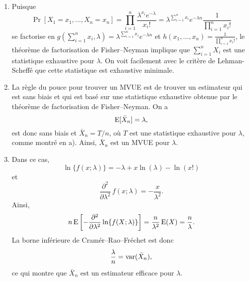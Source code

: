 \begin{solution}{3.16}
\begin{enumerate}
\item Puisque
$$
\Pr[X_1=x_1,\ldots,X_n=x_n]=\prod_{i=1}^n \frac{\lambda^{x_i} e^{-\lambda}}{x_i!}=\lambda^{\sum_{i=1}^n x_i}e^{-\lambda n} \frac{1}{\prod_{i=1}^n x_i!}
$$
se factorise en $g(\sum_{i=1}^n x_i,\lambda)=\lambda^{\sum_{i=1}^n x_i}e^{-\lambda n}$ et $h(x_1,\ldots,x_n)=\frac{1}{\prod_{i=1}^n x_i!}$, le théorème de factorisation de Fisher--Neyman implique que $\sum_{i=1}^n X_i$ est une statistique exhaustive pour $\lambda$. On voit facilement avec le critère de Lehman-Scheffé que cette statistique est exhaustive minimale.

\item La règle du pouce pour trouver un MVUE est de trouver un estimateur qui est sans biais et qui est basé sur une statistique exhaustive obtenue par le théorème de factorisation de Fisher--Neyman. On a
$$
\operatorname{E}[\bar X_n]=\lambda,
$$
est donc sans biais et $\bar X_n=T/n$, où $T$ est une statistique exhaustive pour $\lambda$, comme montré en a).
Ainsi, $\bar X_n$ est un MVUE pour $\lambda$.

\item Dans ce cas,
$$
\ln \{ f(x;\lambda)\} = -\lambda   +x \ln (\lambda) - \ln(x!)
$$
et
$$
\frac{\partial^2}{\partial \lambda^2} \, f(x;\lambda) = - \frac{x}{\lambda^2}.
$$
Ainsi,
$$
n \operatorname{E}\left[ -\frac{\partial^2}{\partial \lambda^2} \ln \{f(X;\lambda)\}\right] = \frac{n}{\lambda^2} \operatorname{E}(X) = \frac{n}{\lambda}.
$$
La borne inférieure de Cram\'er--Rao--Fr\'echet est donc
$$
\frac{\lambda}{n} = \operatorname{var}(\bar X_n),
$$
ce qui montre que $\bar X_n$ est un estimateur efficace pour $\lambda$.
\end{enumerate}
\end{solution}
